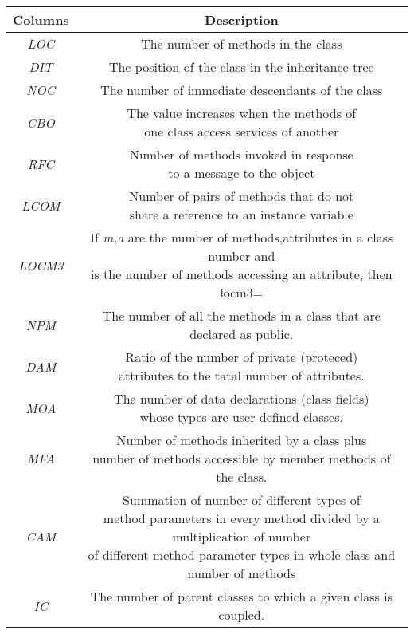 \begin{table}[h]
    \centering
    \begin{tabular}{c|c}
    \toprule[2pt]
        Columns & Description \\
    \toprule[1pt]
        \textit{LOC} & The number of methods in the class \\
        \textit{DIT} & The position of the class in the inheritance tree \\
        \textit{NOC} & The number of immediate descendants of the class\\
        \textit{CBO} & \tabincell{c}{The value increases when the methods of \\ one class access services of another} \\
        \textit{RFC} & \tabincell{c}{Number of methods invoked in response \\ to a message to the object} \\
        \textit{LCOM} & \tabincell{c}{Number of pairs of methods that do not \\ share a reference to an instance variable} \\
        \textit{LOCM3} & \tabincell{c}{If \textit{m,a} are the number of methods,attributes in a class number and \\ is the number of methods accessing an attribute, then locm3=} \\
        \textit{NPM} & The number of all the methods in a class that are declared as public. \\
        \textit{DAM} & \tabincell{c}{Ratio of the number of private (proteced) \\ attributes to the tatal number of attributes.} \\
        \textit{MOA} & \tabincell{c}{The number of data declarations (class fields) \\ whose types are user defined classes.} \\
        \textit{MFA} & \tabincell{c}{Number of methods inherited by a class plus \\ number of methods accessible by member methods of the class.} \\
        \textit{CAM} & \tabincell{c}{Summation of number of different types of \\ method parameters in every method divided by a multiplication of number \\ of different method parameter types in whole class and number of methods} \\
        \textit{IC} & The number of parent classes to which a given class is coupled. \\

\end{tabular}
\end{table}
